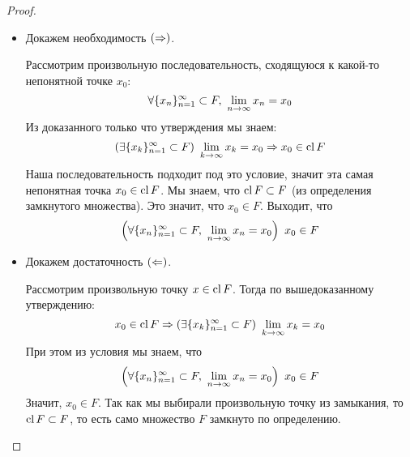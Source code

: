 \begin{proof}~
	\begin{itemize}
		\item Докажем необходимость $(\Rightarrow)$.

			Рассмотрим произвольную последовательность,
			сходящуюся к какой-то непонятной точке $x_0$:
			\[
				\forall \{x_n\}_{n = 1}^\infty \subset F,
				\ \lim\limits_{n \to \infty} x_n = x_0
			\]
			Из доказанного только что утверждения мы знаем:
			\[
				(\exists \{x_k\}_{n = 1}^\infty \subset
				F)\ \lim\limits_{k \to \infty} x_k = x_0 \Rightarrow x_0 \in \operatorname{cl} F
			\]
			Наша последовательность подходит под это условие, значит
			эта самая непонятная точка $x_0 \in \operatorname{cl} F$. Мы знаем, что
			$\operatorname{cl} F \subset F$ (из определения замкнутого множества).
			Это значит, что $x_0 \in F$. Выходит, что
			\[
				\left(\forall \{x_n\}_{n = 1}^\infty \subset F,
				\ \lim\limits_{n \to \infty} x_n = x_0\right)\ x_0 \in F
			\]
		\item Докажем достаточность $(\Leftarrow)$.
	
			Рассмотрим произвольную точку $x \in \operatorname{cl} F$. Тогда
			по вышедоказанному утверждению:
			\[
				x_0 \in \operatorname{cl} F \Rightarrow (\exists \{x_k\}_{n = 1}^\infty \subset
				F)\ \lim\limits_{k \to \infty} x_k = x_0
			\]
			При этом из условия мы знаем, что
			\[
				\left(\forall \{x_n\}_{n = 1}^\infty \subset F,
				\ \lim\limits_{n \to \infty} x_n = x_0\right)\ x_0 \in F
			\]
			Значит, $x_0 \in F$. Так как мы выбирали произвольную
			точку из замыкания, то $\operatorname{cl} F \subset F$, то есть
			само множество $F$ замкнуто по определению.
	\end{itemize}
\end{proof}